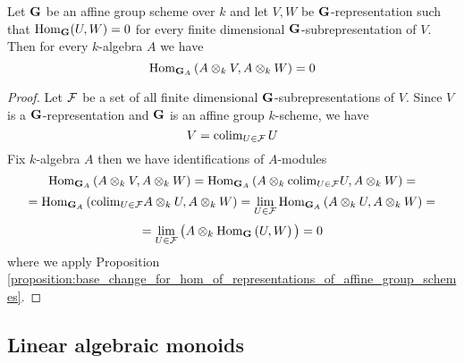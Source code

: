 \begin{proposition}\label{proposition:trivial_homs_stay_trivial}
Let $\mathbf{G}$ be an affine group scheme over $k$ and let $V, W$ be $\mathbf{G}$-representation such that $\mathrm{Hom}_{\mathbf{G}}(U,W) = 0$ for every finite dimensional $\mathbf{G}$-subrepresentation of $V$. Then for every $k$-algebra $A$ we have
$$\mathrm{Hom}_{\mathbf{G}_A}\left(A\otimes_kV,A\otimes_kW\right)=0$$
\end{proposition}
\begin{proof}
Let ${\mathcal F}$ be a set of all finite dimensional $\mathbf{G}$-subrepresentations of $V$. Since $V$ is a $\mathbf{G}$-representation and $\mathbf{G}$ is an affine group $k$-scheme, we have
$$V= \mathrm{colim}_{U\in {\mathcal F}}\,U$$
Fix $k$-algebra $A$ then we have identifications of $A$-modules
$$\mathrm{Hom}_{\mathbf{G}_A}\left(A\otimes_kV,A\otimes_kW\right) = \mathrm{Hom}_{\mathbf{G}_A}\left(A\otimes_k\mathrm{colim}_{U\in {\mathcal F}}U,A\otimes_kW\right) =$$
$$ = \mathrm{Hom}_{\mathbf{G}_A}\left(\mathrm{colim}_{U\in {\mathcal F}}A \otimes_k U,A \otimes_k W\right) = \lim_{U\in {\mathcal F}} \mathrm{Hom}_{\mathbf{G}_A}\left(A \otimes_k U,A \otimes_k W\right) = $$
$$ = \lim_{U\in {\mathcal F}} \big(A\otimes_k\mathrm{Hom}_{\mathbf{G}}\left(U,W\right)\big) = 0$$
where we apply Proposition \ref{proposition:base_change_for_hom_of_representations_of_affine_group_schemes}.
\end{proof}


\subsection{Linear algebraic monoids}

